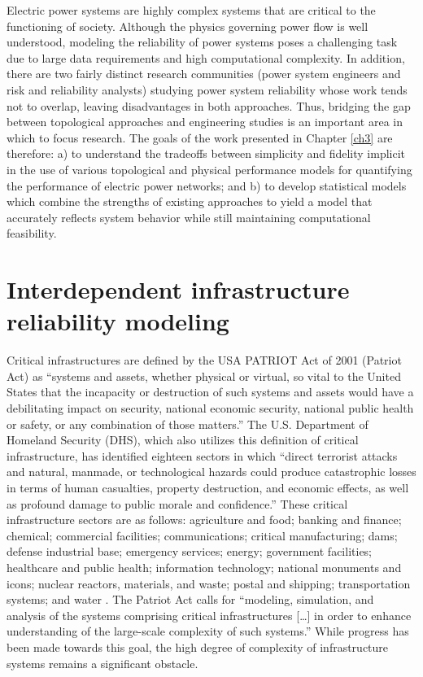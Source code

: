 Electric power systems are highly complex systems that are critical to the functioning of society.  Although the physics governing power flow is well understood, modeling the reliability of power systems poses a challenging task due to large data requirements and high computational complexity.  In addition, there are two fairly distinct research communities (power system engineers and risk and reliability analysts) studying power system reliability whose work tends not to overlap, leaving disadvantages in both approaches.  Thus, bridging the gap between topological approaches and engineering studies is an important area in which to focus research.  The goals of the work presented in Chapter \ref{ch3} are therefore: a) to understand the tradeoffs between simplicity and fidelity implicit in the use of various topological and physical performance models for quantifying the performance of electric power networks; and b) to develop statistical models which combine the strengths of existing approaches to yield a model that accurately reflects system behavior while still maintaining computational feasibility.


\section{Interdependent infrastructure reliability modeling}
\label{sec:ch1:interdependentreliability}

Critical infrastructures are defined by the USA PATRIOT Act of 2001 (Patriot Act) as ``systems and assets, whether physical or virtual, so vital to the United States that the incapacity or destruction of such systems and assets would have a debilitating impact on security, national economic security, national public health or safety, or any combination of those matters\cite{Patriot2001}.'' The U.S. Department of Homeland Security (DHS), which also utilizes this definition of critical infrastructure, has identified eighteen sectors in which ``direct terrorist attacks and natural, manmade, or technological hazards could produce catastrophic losses in terms of human casualties, property destruction, and economic effects, as well as profound damage to public morale and confidence\cite{DHS2006}.''  These critical infrastructure sectors are as follows: agriculture and food; banking and finance; chemical; commercial facilities; communications; critical manufacturing; dams; defense industrial base; emergency services; energy; government facilities; healthcare and public health; information technology; national monuments and icons; nuclear reactors, materials, and waste; postal and shipping; transportation systems; and water \cite{DHS2006}. The Patriot Act calls for ``modeling, simulation, and analysis of the systems comprising critical infrastructures [\ldots] in order to enhance understanding of the large-scale complexity of such systems\cite{Patriot2001}.''  While progress has been made towards this goal, the high degree of complexity of infrastructure systems remains a significant obstacle.

